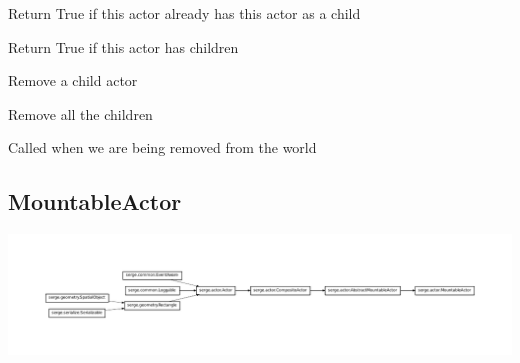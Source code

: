 \documentclass[letterpaper,10pt,english]{sphinxmanual}
\begin{document}
\begin{fulllineitems}
\begin{fulllineitems}
\label{actor:serge.actor.CompositeActor.hasChild}
Return True if this actor already has this actor as a child

\end{fulllineitems}


\begin{fulllineitems}
\label{actor:serge.actor.CompositeActor.hasChildren}
Return True if this actor has children

\end{fulllineitems}


\begin{fulllineitems}
\label{actor:serge.actor.CompositeActor.removeChild}
Remove a child actor

\end{fulllineitems}


\begin{fulllineitems}
\label{actor:serge.actor.CompositeActor.removeChildren}
Remove all the children

\end{fulllineitems}


\begin{fulllineitems}
\label{actor:serge.actor.CompositeActor.removedFromWorld}
Called when we are being removed from the world

\end{fulllineitems}


\end{fulllineitems}



\subsection{MountableActor}
\label{actor:mountableactor}
\includegraphics{inheritance-a5b8c8041a7dda9bc1cee193da3149de85ddbd9b.pdf}
\end{document}
